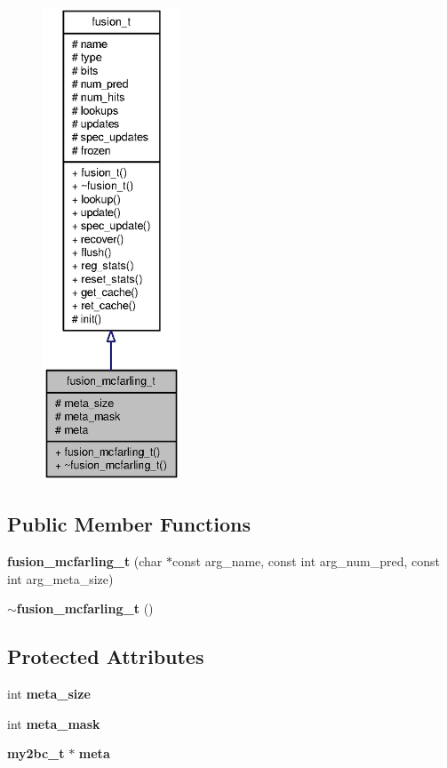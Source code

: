 \begin{figure}[H]
\begin{center}
\leavevmode
\includegraphics[height=400pt]{classfusion__mcfarling__t__coll__graph}
\end{center}
\end{figure}
\subsection*{Public Member Functions}
\begin{CompactItemize}
\item 
{\bf fusion\_\-mcfarling\_\-t} (char $\ast$const arg\_\-name, const int arg\_\-num\_\-pred, const int arg\_\-meta\_\-size)
\item 
{\bf $\sim$fusion\_\-mcfarling\_\-t} ()
\end{CompactItemize}
\subsection*{Protected Attributes}
\begin{CompactItemize}
\item 
int {\bf meta\_\-size}
\item 
int {\bf meta\_\-mask}
\item 
{\bf my2bc\_\-t} $\ast$ {\bf meta}
\end{CompactItemize}


